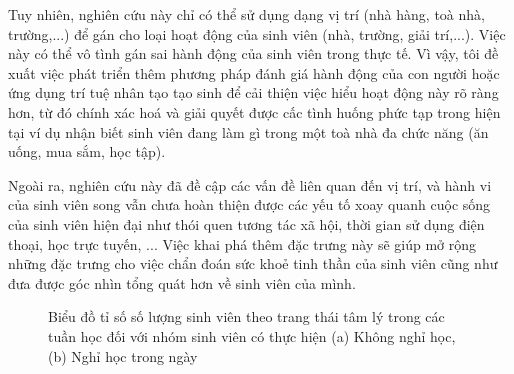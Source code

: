 Tuy nhiên, nghiên cứu này chỉ có thể sử dụng dạng vị trí (nhà hàng, toà nhà, trường,...) để gán cho loại hoạt động của sinh viên (nhà, trường, giải trí,...). Việc này có thể vô tình gán sai hành động của sinh viên trong thực tế. Vì vậy, tôi đề xuất việc phát triển thêm phương pháp đánh giá hành động của con người hoặc ứng dụng trí tuệ nhân tạo tạo sinh để cải thiện việc hiểu hoạt động này rõ ràng hơn, từ đó chính xác hoá và giải quyết được cấc tình huống phức tạp trong hiện tại ví dụ nhận biết sinh viên đang làm gì trong một toà nhà đa chức năng (ăn uống, mua sắm, học tập).

Ngoài ra, nghiên cứu này đã đề cập các vấn đề liên quan đến vị trí, và hành vi của sinh viên song vẫn chưa hoàn thiện được các yếu tố xoay quanh cuộc sống của sinh viên hiện đại như thói quen tương tác xã hội, thời gian sử dụng điện thoại, học trực tuyến, ... Việc khai phá thêm đặc trưng này sẽ giúp mở rộng những đặc trưng cho việc chẩn đoán sức khoẻ tinh thần của sinh viên cũng như đưa được góc nhìn tổng quát hơn về sinh viên của mình.

\begin{figure}[!ht]
\caption{Biểu đồ tỉ số số lượng sinh viên theo trang thái tâm lý trong các tuần học đối với nhóm sinh viên có thực hiện (a) Không nghỉ học, (b) Nghỉ học trong ngày}
\label{feat_imp}
\end{figure}

